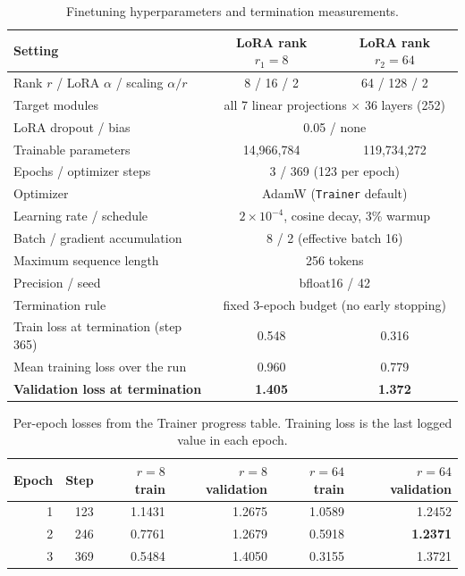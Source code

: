 \documentclass[11pt]{article}
\begin{document}
\begin{table}[H]
  \centering
  \caption{Finetuning hyperparameters and termination measurements.}
  \label{tab:hyperparameters}
  \small
  \begin{tabular}{lcc}
    \toprule
    \textbf{Setting} & \textbf{LoRA rank $r_1 = 8$} & \textbf{LoRA rank $r_2 = 64$} \\
    \midrule
    Rank $r$ / LoRA $\alpha$ / scaling $\alpha/r$ & 8 / 16 / 2 & 64 / 128 / 2 \\
    Target modules & \multicolumn{2}{c}{all 7 linear projections $\times$ 36 layers (252)} \\
    LoRA dropout / bias & \multicolumn{2}{c}{0.05 / none} \\
    Trainable parameters & 14,966,784 & 119,734,272 \\
    Epochs / optimizer steps & \multicolumn{2}{c}{3 / 369 (123 per epoch)} \\
    Optimizer & \multicolumn{2}{c}{AdamW (\texttt{Trainer} default)} \\
    Learning rate / schedule & \multicolumn{2}{c}{$2\times10^{-4}$, cosine decay, 3\% warmup} \\
    Batch / gradient accumulation & \multicolumn{2}{c}{8 / 2 (effective batch 16)} \\
    Maximum sequence length & \multicolumn{2}{c}{256 tokens} \\
    Precision / seed & \multicolumn{2}{c}{bfloat16 / 42} \\
    Termination rule & \multicolumn{2}{c}{fixed 3-epoch budget (no early stopping)} \\
    Train loss at termination (step 365) & 0.548 & 0.316 \\
    Mean training loss over the run & 0.960 & 0.779 \\
    \textbf{Validation loss at termination} & \textbf{1.405} & \textbf{1.372} \\
    \bottomrule
  \end{tabular}
\end{table}

\begin{table}[H]
  \centering
  \caption{Per-epoch losses from the Trainer progress table. Training loss is the last logged value in each epoch.}
  \label{tab:epoch-loss}
  \begin{tabular}{rrrrrr}
    \toprule
    \textbf{Epoch} & \textbf{Step} & \textbf{$r = 8$ train} & \textbf{$r = 8$ validation} & \textbf{$r = 64$ train} & \textbf{$r = 64$ validation} \\
    \midrule
    1 & 123 & 1.1431 & 1.2675 & 1.0589 & 1.2452 \\
    2 & 246 & 0.7761 & 1.2679 & 0.5918 & \textbf{1.2371} \\
    3 & 369 & 0.5484 & 1.4050 & 0.3155 & 1.3721 \\
    \bottomrule
  \end{tabular}
\end{table}
\end{document}
